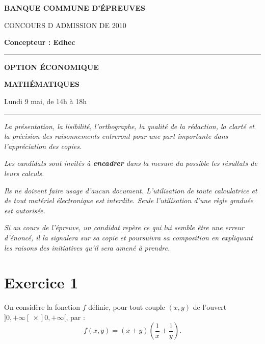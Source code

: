 \documentclass[11pt]{article}%
\begin{document}

\begin{center}
{\LARG\E\textbf{BANQUE COMMUNE D'ÉPREUVES}}



{\large \textsc{CONCOURS D ADMISSION DE 2010}}



{\large \textbf{Concepteur : Edhec}}



\rule{2.39cm}{0.05cm}



{\Large \textbf{OPTION ÉCONOMIQUE}}



{\Large \textbf{MATHÉMATIQUES }}



{\Large Lundi 9 mai, de 14h à 18h}



\rule{2.39cm}{0.05cm}
\end{center}

\textit{La présentation, la lisibilité, l'orthographe, la qualité
de la rédaction, la clarté et la précision des raisonnements
entreront pour une part importante dans l'appréciation des copies.}

\textit{Les candidats sont invités à \textbf{encadrer} dans la mesure
du possible les résultats de leurs calculs.}

\textit{Ils ne doivent faire usage d'aucun document. L'utilisation de
toute
calculatrice et de tout matériel électronique est interdite. Seule
l'utilisation d'une règle graduée est autorisée.}

\textit{Si au cours de l'épreuve, un candidat repère ce qui lui semble
être une erreur d'énoncé, il la signalera sur sa copie et
poursuivra sa composition en expliquant les raisons des initiatives
qu'il sera
amené à prendre.}

\vspace*{3cm}

\section*{Exercice 1}

On considère la fonction $f$ définie, pour tout couple $(x,y)$ de
l'ouvert $]0, + \infty[ \ \times]0, + \infty[$, par : 
\[
f(x,y) = (x + y)\left(\dfrac 1x + \dfrac 1y\right). 
\]
\end{document}
